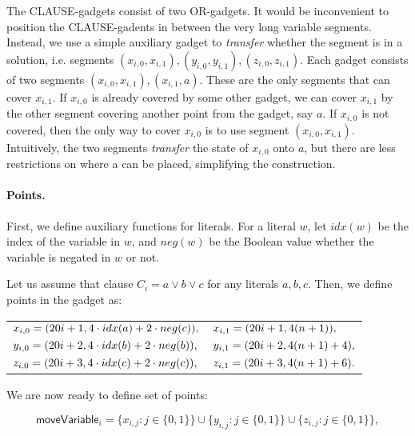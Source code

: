The CLAUSE-gadgets consist of two OR-gadgets.
It would be inconvenient to position the CLAUSE-gadents
in between the very long variable segments.
Instead, we use a simple auxiliary gadget to
\textit{transfer} whether the segment
is in a solution, i.e. segments
$(x_{i, 0}, x_{i, 1}), (y_{i, 0}, y_{i, 1}), (z_{i, 0}, z_{i, 1})$.
Each gadget consists of two segments $(x_{i, 0}, x_{i, 1}), (x_{i, 1}, a)$.
These are the only segments that can cover $x_{i,1}$.
If $x_{i,0}$ is already covered by some other gadget,
we can cover $x_{i,1}$ by the other segment covering another point
from the gadget, say $a$.
If $x_{i,0}$ is not covered, then the only way to cover $x_{i,0}$
is to use segment $(x_{i, 0}, x_{i, 1})$.
Intuitively, the two segments \textit{transfer} the state of $x_{i,0}$
onto $a$, but there are less restrictions on where a can be placed,
simplifying the construction.

\paragraph{Points.}

\newcommand{\pointsClause}{\mathsf{pointsClause}}


First, we define auxiliary functions for literals. 
For a literal $w$, let $idx(w)$ be the index of the variable in $w$,
and $neg(w)$ be the Boolean value whether the variable is negated in $w$
or not.

Let us assume that clause $C_i = a \lor b \lor c$
for any literals $a,b,c$. Then, we define points in the gadget as:

\begin{center}
\begin{tabular}{ l l }
	$x_{i, 0} = (20 i+1, 4\cdot idx(a) + 2\cdot neg(c)),$ &
	$x_{i, 1} = (20 i+1, 4(n+1)),$ \\
	$y_{i, 0} = (20 i+2, 4\cdot idx(b) + 2\cdot neg(b)),$ &
	$y_{i, 1} = (20 i+2, 4(n+1) + 4),$ \\
	$z_{i, 0} = (20 i+3, 4\cdot idx(c) + 2\cdot neg(c)),$ &
	$z_{i, 1} = (20 i+3, 4(n+1) + 6).$
\end{tabular}
\end{center}

\newcommand{\segmentsClause}{\mathsf{segmentsClause}}	
 
We are now ready to define set of points:
 
 $$\mathsf{moveVariable}_i = 
 \{x_{i, j} : j \in \{0, 1\}\} \cup
 \{y_{i, j} : j \in \{0, 1\}\} \cup
 \{z_{i, j} : j \in \{0, 1\}\},
 $$
 

